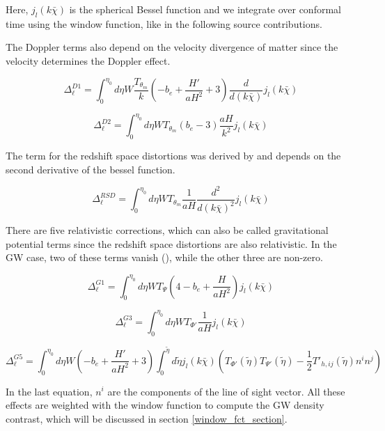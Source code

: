 Here, $j_l(k \bar{\chi})$ is the spherical Bessel function and we integrate over conformal time using the window function, like in the following source contributions.

The Doppler terms also depend on the velocity divergence of matter since the velocity determines the Doppler effect.

\begin{equation}
    \Delta_\ell^{D1}=\int_0^{\eta_0} d\eta W \frac{T_{\theta_m}}{k} \left(-b_e + \frac{H'}{aH^2}+3\right)\frac{d}{d(k\bar{\chi})} j_l(k \bar{\chi})
\end{equation}

\begin{equation}
    \Delta_\ell^{D2}=\int_0^{\eta_0} d\eta W T_{\theta_m}(b_e-3) \frac{aH}{k^2} j_l(k \bar{\chi})
\end{equation}

The term for the redshift space distortions was derived by \cite{kaiser_clustering_1987} and depends on the second derivative of the bessel function.

\begin{equation}
    \Delta_\ell^{RSD}=\int_0^{\eta_0} d\eta W T_{\theta_m} \frac{1}{aH}\frac{d^2}{d(k\bar{\chi})^2} j_l(k \bar{\chi})
\end{equation}

There are five relativistic corrections, which can also be called gravitational potential terms since the redshift space distortions are also relativistic. In the GW case, two of these terms vanish (\cite{dallarmi_dipole_2022}), while the other three are non-zero.

\begin{equation}
    \Delta_\ell^{G1}=\int_0^{\eta_0} d\eta W T_\Psi \left(4-b_e+\frac{H}{aH^2}\right) j_l(k \bar{\chi})
\end{equation}

\begin{equation}
    \Delta_\ell^{G3}=\int_0^{\eta_0} d\eta W T_{\Phi'} \frac{1}{aH} j_l(k \bar{\chi})
\end{equation}

\begin{equation}
    \Delta_\ell^{G5}=\int_0^{\eta_0} d\eta W \left(-b_e + \frac{H'}{aH^2} +3\right) \int_0^{\tilde{\eta}} d\tilde{\eta} j_l(k \bar{\chi}) \left( T_{\Phi'}(\tilde{\eta})T_{\Psi'}(\tilde{\eta})-\frac{1}{2}T'_{h, ij}(\tilde{\eta})n^i n^j \right)
\end{equation}

In the last equation, $n^i$ are the components of the line of sight vector.
All these effects are weighted with the window function to compute the GW density contrast, which will be discussed in section \ref{window_fct_section}.

